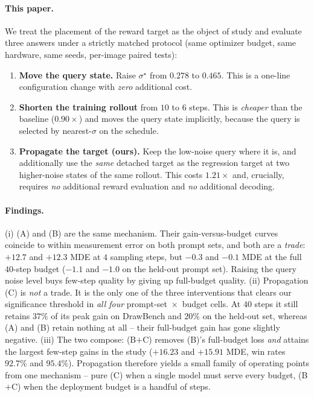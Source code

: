 \paragraph{This paper.} We treat the placement of the reward target as the object of
study and evaluate three answers under a strictly matched protocol
(same optimizer budget, same hardware, same seeds, per-image paired tests):

\begin{enumerate}[leftmargin=1.6em,itemsep=2pt]
\item[\textbf{(A)}] \textbf{Move the query state.} Raise $\sigma^\star$ from $0.278$ to
$0.465$. This is a one-line configuration change with \emph{zero} additional cost.
\item[\textbf{(B)}] \textbf{Shorten the training rollout} from $10$ to $6$ steps. This is
\emph{cheaper} than the baseline ($0.90\times$) and moves the query state implicitly,
because the query is selected by nearest-$\sigma$ on the schedule.
\item[\textbf{(C)}] \textbf{Propagate the target (ours).} Keep the low-noise query where
it is, and additionally use the \emph{same} detached target as the regression target at
two higher-noise states of the same rollout. This costs $1.21\times$ and, crucially,
requires \emph{no} additional reward evaluation and \emph{no} additional decoding.
\end{enumerate}

\paragraph{Findings.} (i) (A) and (B) are the same mechanism. Their gain-versus-budget
curves coincide to within measurement error on both prompt sets, and both are a
\emph{trade}: $+12.7$ and $+12.3$ MDE at $4$ sampling steps, but $-0.3$ and $-0.1$ MDE at
the full $40$-step budget ($-1.1$ and $-1.0$ on the held-out prompt set). Raising the
query noise level buys few-step quality by giving up full-budget quality.
(ii) Propagation (C) is \emph{not} a trade. It is the only one of the three
interventions that clears our significance threshold in \emph{all four}
prompt-set~$\times$~budget cells. At $40$ steps it still retains $37\%$ of its peak gain on
DrawBench and $20\%$ on the held-out set, whereas (A) and (B) retain nothing at all --
their full-budget gain has gone slightly negative.
(iii) The two compose: (B$+$C) removes (B)'s full-budget loss \emph{and} attains the
largest few-step gains in the study ($+16.23$ and $+15.91$ MDE, win rates $92.7\%$ and
$95.4\%$). Propagation therefore yields a small family of operating points from one
mechanism -- pure (C) when a single model must serve every budget, (B$+$C) when the
deployment budget is a handful of steps.

